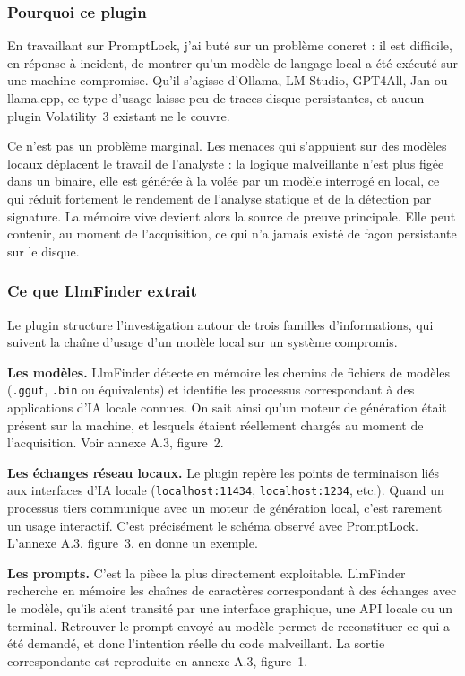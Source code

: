\subsubsection*{Pourquoi ce plugin}

En travaillant sur PromptLock, j'ai buté sur un problème concret : il est difficile, en
réponse à incident, de montrer qu'un modèle de langage local a été exécuté sur une
machine compromise. Qu'il s'agisse d'Ollama, LM Studio, GPT4All, Jan ou llama.cpp, ce
type d'usage laisse peu de traces disque persistantes, et aucun plugin Volatility~3
existant ne le couvre.

Ce n'est pas un problème marginal. Les menaces qui s'appuient sur des modèles locaux déplacent le
travail de l'analyste : la logique malveillante n'est plus figée dans un binaire, elle est générée à la volée par un modèle interrogé en local, ce qui réduit
fortement le rendement de l'analyse statique et de la détection par signature. La mémoire
vive devient alors la source de preuve principale. Elle peut contenir, au moment de
l'acquisition, ce qui n'a jamais existé de façon persistante sur le disque.

\subsubsection*{Ce que LlmFinder extrait}

Le plugin structure l'investigation autour de trois familles d'informations, qui suivent
la chaîne d'usage d'un modèle local sur un système compromis.

\textbf{Les modèles.} LlmFinder détecte en mémoire les chemins de fichiers de modèles
(\texttt{.gguf}, \texttt{.bin} ou équivalents) et identifie les processus correspondant
à des applications d'IA locale connues. On sait ainsi qu'un moteur de génération était
présent sur la machine, et lesquels étaient réellement chargés au moment de
l'acquisition. Voir annexe A.3, figure~2.

\textbf{Les échanges réseau locaux.} Le plugin repère les points de terminaison liés
aux interfaces d'IA locale (\texttt{localhost:11434}, \texttt{localhost:1234}, etc.).
Quand un processus tiers communique avec un moteur de génération local, c'est rarement
un usage interactif. C'est précisément le schéma observé avec PromptLock. L'annexe A.3, figure~3, en
donne un exemple.

\textbf{Les prompts.} C'est la pièce la plus directement exploitable. LlmFinder
recherche en mémoire les chaînes de caractères correspondant à des échanges avec le
modèle, qu'ils aient transité par une interface graphique, une API locale ou un terminal.
Retrouver le prompt envoyé au modèle permet de reconstituer ce qui a été demandé, et
donc l'intention réelle du code malveillant. La sortie correspondante est reproduite en annexe A.3,
figure~1.

